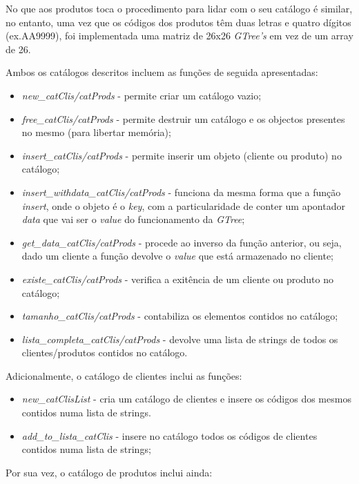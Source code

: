 \documentclass{article}
\begin{document}
No que aos produtos toca o procedimento para lidar com o seu catálogo é similar, no entanto, uma vez que os códigos dos produtos têm duas letras e quatro dígitos (ex.AA9999), foi implementada uma matriz de 26x26 \textit{GTree's} em vez de um array de 26. 

Ambos os catálogos descritos incluem as funções de seguida apresentadas:

\begin{itemize}
\item \textit{new\_catClis/catProds} - permite criar um catálogo vazio;
\item \textit{free\_catClis/catProds} - permite destruir um catálogo e os objectos presentes no mesmo (para libertar memória);
\item \textit{insert\_catClis/catProds} - permite inserir um objeto (cliente ou produto) no catálogo;
\item \textit{insert\_withdata\_catClis/catProds} - funciona da mesma forma que a função \textit{insert}, onde o objeto é o \textit{key}, com a particularidade de conter um apontador \textit{data} que vai ser o \textit{value} do funcionamento da \textit{GTree};
\item \textit{get\_data\_catClis/catProds} - procede ao inverso da função anterior, ou seja, dado um cliente a função devolve o \textit{value} que está armazenado no cliente;
\item \textit{existe\_catClis/catProds} - verifica a exitência de um cliente ou produto no catálogo;
\item \textit{tamanho\_catClis/catProds} - contabiliza os elementos contidos no catálogo;
\item \textit{lista\_completa\_catClis/catProds} - devolve uma lista de strings de todos os clientes/produtos contidos no catálogo.
\end{itemize}

Adicionalmente, o catálogo de clientes inclui as funções:

\begin{itemize}
\item \textit{new\_catClisList} - cria um catálogo de clientes e insere os códigos dos mesmos contidos numa lista de strings.
\item \textit{add\_to\_lista\_catClis} - insere no catálogo todos os códigos de clientes contidos numa lista de strings;
\end{itemize}

Por sua vez, o catálogo de produtos inclui ainda:
\end{document}
